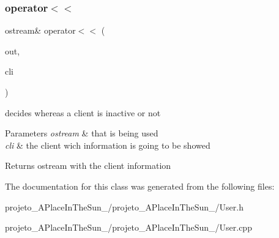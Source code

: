 \subsubsection{\texorpdfstring{operator$<$$<$}{operator<<}}
{\footnotesize\ttfamily ostream\& operator$<$$<$ (\begin{DoxyParamCaption}\item[{ostream \&}]{out,  }\item[{const \hyperlink{class_client}{Client} \&}]{cli }\end{DoxyParamCaption})\hspace{0.3cm}{\ttfamily [friend]}}



decides whereas a client is inactive or not 


\begin{DoxyParams}{Parameters}
{\em ostream} & that is being used\\
\hline
{\em cli} & the client wich information is going to be showed\\
\hline
\end{DoxyParams}
\begin{DoxyReturn}{Returns}
ostream with the client information 
\end{DoxyReturn}


The documentation for this class was generated from the following files\+:\begin{DoxyCompactItemize}
\item 
projeto\+\_\+\+A\+Place\+In\+The\+Sun\+\_/projeto\+\_\+\+A\+Place\+In\+The\+Sun\+\_/User.\+h\item 
projeto\+\_\+\+A\+Place\+In\+The\+Sun\+\_/projeto\+\_\+\+A\+Place\+In\+The\+Sun\+\_/User.\+cpp\end{DoxyCompactItemize}
